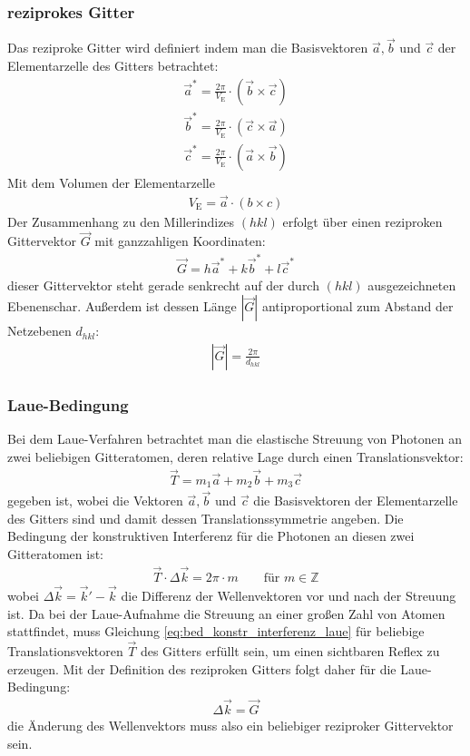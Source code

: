 \documentclass[11pt, a4paper]{article}
\begin{document}
\subsubsection{reziprokes Gitter}
Das reziproke Gitter wird definiert indem man die Basisvektoren $\vec{a}, \vec{b}$ und $\vec{c}$ der Elementarzelle des Gitters betrachtet\cite{demtroeder}:
\begin{align}
  \vec{a}^{*} = \frac{2\pi}{V_\mathrm{E}} \cdot ( \vec{b} \times \vec{c} ) \nonumber\\
  \vec{b}^{*} = \frac{2\pi}{V_\mathrm{E}} \cdot ( \vec{c} \times \vec{a} ) \nonumber\\
  \vec{c}^{*} = \frac{2\pi}{V_\mathrm{E}} \cdot ( \vec{a} \times \vec{b} )
\end{align}
Mit dem Volumen der Elementarzelle
\begin{align}
  V_\mathrm{E} = \vec{a} \cdot \left( b \times c \right)
\end{align}
Der Zusammenhang zu den Millerindizes $(hkl)$ erfolgt über einen reziproken Gittervektor $\vec{G}$ mit ganzzahligen Koordinaten:
\begin{align}
  \vec{G} = h \vec{a}^{*} + k \vec{b}^{*} + l \vec{c}^{*}
  \label{eq:rezip_miller}
\end{align}
dieser Gittervektor steht gerade senkrecht auf der durch $(hkl)$ ausgezeichneten Ebenenschar. Außerdem ist dessen Länge $| \vec{G} |$ antiproportional zum Abstand der Netzebenen $d_{hkl}$:
\begin{align}
  | \vec{G} | = \frac{2\pi}{d_{hkl}}
  \label{eq:netzebenenabstand}
\end{align}

\subsubsection{Laue-Bedingung}
Bei dem Laue-Verfahren betrachtet man die elastische Streuung von Photonen an zwei beliebigen Gitteratomen, deren relative Lage durch einen Translationsvektor:
\begin{align}
  \vec{T} = m_1 \vec{a} + m_2 \vec{b} + m_3 \vec{c}
\end{align}
gegeben ist, wobei die Vektoren $\vec{a}, \vec{b}$ und $\vec{c}$ die Basisvektoren der Elementarzelle des Gitters sind und damit dessen Translationssymmetrie angeben.
Die Bedingung der konstruktiven Interferenz für die Photonen an diesen zwei Gitteratomen ist:
\begin{align}
  \vec{T} \cdot \Delta \vec{k} = 2\pi \cdot m \qquad \text{für } m \in \mathbb{Z}
  \label{eq:bed_konstr_interferenz_laue}
\end{align}
wobei $\Delta \vec{k} = \vec{k}' - \vec{k}$ die Differenz der Wellenvektoren vor und nach der Streuung ist.
Da bei der Laue-Aufnahme die Streuung an einer großen Zahl von Atomen stattfindet, muss Gleichung \ref{eq:bed_konstr_interferenz_laue} für beliebige Translationsvektoren $\vec{T}$ des Gitters erfüllt sein, um einen sichtbaren Reflex zu erzeugen.
Mit der Definition des reziproken Gitters folgt daher für die Laue-Bedingung:
\begin{align}
  \Delta \vec{k} = \vec{G}
\end{align}
die Änderung des Wellenvektors muss also ein beliebiger reziproker Gittervektor sein.
\end{document}

